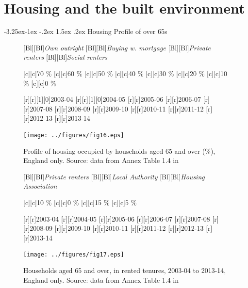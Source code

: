 \documentclass[11 pt, a4paper]{report}
\makeatletter
\renewcommand\section{\@startsection {section}{1}{\z@}%
                                   {-3.5ex \@plus -1ex \@minus -.2ex}%
                                   {2.3ex \@plus.2ex}%
                                   {\Large\itshape}}
\renewcommand\subsection{\@startsection{subsection}{2}{\z@}%
                                     {-3.25ex\@plus -1ex \@minus -.2ex}%
                                     {1.5ex \@plus .2ex}%
    								{\large\scshape}}
\makeatother
\begin{document}
\clearpage


\chapter{Housing and the built environment} %
\subsection{Housing Profile of over 65s}

\begin{figure}[hbtp!]
[Bl][Bl]{\small\emph{Own outright}}
[Bl][Bl]{\small\emph{Buying w. mortgage}}
[Bl][Bl]{\small\emph{Private renters}}
[Bl][Bl]{\small\emph{Social renters}}


[c][c]{\small{70 \%}}
[c][c]{\small{60 \%}}
[c][c]{\small{50 \%}}
[c][c]{\small{40 \%}}
[c][c]{\small{30 \%}}
[c][c]{\small{20 \%}}
[c][c]{\small{10 \%}}
[c][c]{\small{0 \%}}

[r][r][1][0]{\small{2003-04}}
[r][r][1][0]{\small{2004-05}}
[r][r]{\small{2005-06}}
[r][r]{\small{2006-07}}
[r][r]{\small{2007-08}}
[r][r]{\small{2008-09}}
[r][r]{\small{2009-10}}
[r][r]{\small{2010-11}}
[r][r]{\small{2011-12}}
[r][r]{\small{2012-13}}
[r][r]{\small{2013-14}}

\texttt{[image: ../figures/fig16.eps]}
\caption{Profile of housing occupied by households aged 65 and over (\%), England only. Source: data from Annex Table 1.4 in  \citet{DCLG2015}}\label{Fig:16} %
\end{figure}

%

\begin{figure}[hbtp!]
[Bl][Bl]{\emph{Private renters}}
[Bl][Bl]{\emph{Local Authority}}
[Bl][Bl]{\emph{Housing Association}}

[c][c]{\small{10 \%}}
[c][c]{\small{0 \%}}
[c][c]{\small{15 \%}}
[c][c]{\small{5 \%}}

[r][r]{\small{2003-04}}
[r][r]{\small{2004-05}}
[r][r]{\small{2005-06}}
[r][r]{\small{2006-07}}
[r][r]{\small{2007-08}}
[r][r]{\small{2008-09}}
[r][r]{\small{2009-10}}
[r][r]{\small{2010-11}}
[r][r]{\small{2011-12}}
[r][r]{\small{2012-13}}
[r][r]{\small{2013-14}}

\texttt{[image: ../figures/fig17.eps]}
\caption{Households aged 65 and over, in rented tenures, 2003-04 to 2013-14, England only. Source: data from Annex Table 1.4 in  \citet{DCLG2015}}\label{Fig:17} %
\end{figure}
\end{document}
